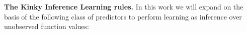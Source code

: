 \documentclass{article} %
\theoremstyle{definition}
\theoremstyle{remark}
\newcommand{\data}{\ensuremath{ \mathcal D} }
\newcommand{\inspace}{\ensuremath{ \mathcal X}}
\newcommand{\outspace}{\ensuremath{ \mathcal Y}}
\newcommand{\predfn}{\, \mathfrak{  \hat f_n}} %
\newcommand{\predfnj}{\, \mathfrak{  \hat f_{n,j}}} %
\newcommand{\prederr}{\, \mathfrak{\hat v}} %
\newcommand{\prederrn}{\, \mathfrak{\hat v_n}} %
\newcommand{\prederrnj}{\, \mathfrak{\hat v_{n,j}}} %
\newcommand{\prederrbox}{\, {\hat H}} %
\begin{document}
%




\textbf{The Kinky Inference Learning rules.}
In this work we will expand on the basis of the following class of predictors to perform learning as inference over unobserved function values:
\end{document}
